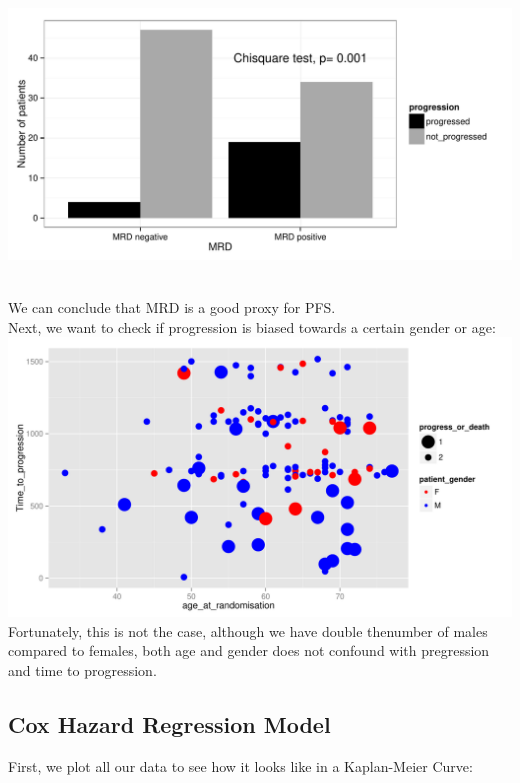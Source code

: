 \documentclass[a4paper,11pt]{article}
\begin{document}
\includegraphics{HICF1_Finalreportv6-027}

\\ We can conclude that MRD is a good proxy for PFS.\\
Next, we want to check if progression is biased towards a certain gender or age:\\
\includegraphics{HICF1_Finalreportv6-028}
\\Fortunately, this is not the case, although we have double thenumber of males compared to females, both age and gender does not confound with pregression and time to progression.
\subsection{Cox Hazard Regression Model}
First, we plot all our data to see how it looks like in a Kaplan-Meier Curve:\\
\end{document}
